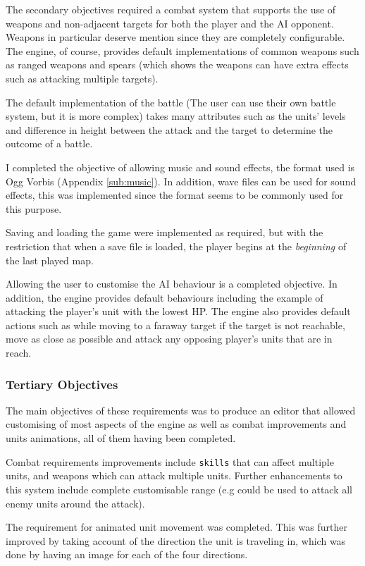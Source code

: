 The secondary objectives required a combat system that supports the use of weapons and non-adjacent targets for both the player and the AI opponent. Weapons in particular deserve  mention since they are completely configurable. The engine, of course, provides default implementations of common weapons such as ranged weapons and spears (which shows the weapons can have extra effects such as attacking multiple targets). 

The default implementation  of the battle (The user can use their own battle system, but it is more complex) takes many attributes such as the units' levels and difference in height between the attack and the target to determine the outcome of a battle. 

I completed the objective of allowing music and sound effects, the format used is Ogg Vorbis (Appendix \ref{sub:music}). In addition, wave files can be used for sound effects, this was implemented since the format seems to be commonly used for this purpose.

Saving and loading the game were implemented as required, but with the restriction that when a save file is loaded, the player begins at the \emph{beginning} of the last played map.

Allowing the user to customise the AI behaviour is a completed objective. In addition, the engine provides default behaviours including the example of attacking the player's unit with the lowest HP. The engine also provides default actions such as while moving to a faraway target if the target is not reachable, move as close as possible and attack any opposing player's units that are in reach. 

\subsubsection{Tertiary Objectives}
The main objectives of these requirements was to produce an editor that allowed customising of most aspects of the engine as well as combat improvements and units animations, all of them having been completed. 

Combat requirements improvements include \texttt{skills} that can affect multiple units, and weapons which can attack multiple units. Further enhancements to this system include complete customisable range (e.g could be used to attack all enemy units around the attack).

The requirement for animated unit movement was completed. This was further improved by taking account of the direction the unit is traveling in, which was done by having an  image for each of the four directions. 

